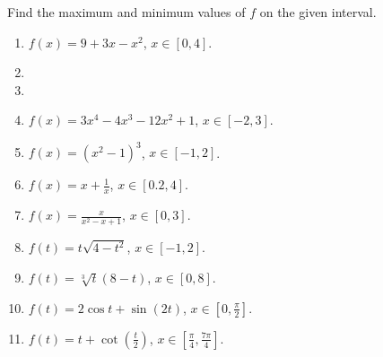 Find the maximum and minimum values of $f$ on the given interval. 
\begin{multicols}{2}
\begin{enumerate}[ref={\fcProblemRef}]
\item $\displaystyle f(x)=9+3x-x^2$, $x\in [0,4]$.

\item 
\item 


\item $\displaystyle f(x)=3x^4-4x^3-12x^2+1$, $x\in [-2, 3]$.

\item $\displaystyle f(x)=(x^2-1)^3$, $x\in [-1, 2]$.

\item $\displaystyle f(x)=x+\frac{1}{x}$, $x\in [0.2,4 ]$.

\item $\displaystyle f(x)=\frac{x}{x^2-x+1}$, $x\in [0,3 ]$.

\item $\displaystyle f(t)=t\sqrt{4-t^2}$, $x\in [-1,2 ]$.

\item $\displaystyle f(t)=\sqrt[3]{t}(8-t) $, $x\in [0,8 ]$.

\item $\displaystyle f(t)=2\cos t+\sin (2t)$, $x\in [0,\frac{\pi}{2} ]$.

\item $\displaystyle f(t)=t+\cot \left(\frac{t}{2}\right) $, $x\in [\frac{\pi}{4},\frac{7\pi}{4} ]$.

\end{enumerate}
\end{multicols}
